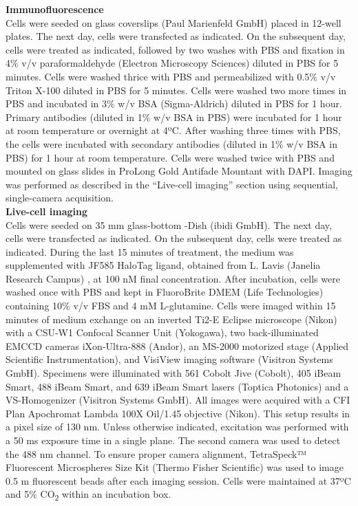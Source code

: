 \textbf{Immunofluorescence} \\
Cells were seeded on glass coverslips (Paul Marienfeld GmbH) placed in 12-well plates.
The next day, cells were transfected as indicated.
On the subsequent day, cells were treated as indicated, followed by two washes with PBS and fixation in 4\% v/v paraformaldehyde (Electron Microscopy Sciences) diluted in PBS for 5 minutes.
Cells were washed thrice with PBS and permeabilized with 0.5\% v/v Triton X-100 diluted in PBS for 5 minutes.
Cells were washed two more times in PBS and incubated in 3\% w/v BSA (Sigma-Aldrich) diluted in PBS for 1 hour.
Primary antibodies (diluted in 1\% w/v BSA in PBS) were incubated for 1 hour at room temperature or overnight at 4ºC.
After washing three times with PBS, the cells were incubated with secondary antibodies (diluted in 1\% w/v BSA in PBS) for 1 hour at room temperature.
Cells were washed twice with PBS and mounted on glass slides in ProLong Gold Antifade Mountant with DAPI.
Imaging was performed as described in the “Live-cell imaging” section using sequential, single-camera acquisition.
\\

\textbf{Live-cell imaging} \\
Cells were seeded on 35 mm glass-bottom \textmu -Dish (ibidi GmbH).
The next day, cells were transfected as indicated.
On the subsequent day, cells were treated as indicated.
During the last 15 minutes of treatment, the medium was supplemented with JF585 HaloTag ligand, obtained from L. Lavis (Janelia Research Campus) \cite{grimm_general_2015,grimm_general_2017}, at 100 nM final concentration.
After incubation, cells were washed once with PBS and kept in FluoroBrite DMEM (Life Technologies) containing 10\% v/v FBS and 4 mM L-glutamine.
Cells were imaged within 15 minutes of medium exchange on an inverted Ti2-E Eclipse microscope (Nikon) with a CSU-W1 Confocal Scanner Unit (Yokogawa), two back-illuminated EMCCD cameras iXon-Ultra-888 (Andor), an MS-2000 motorized stage (Applied Scientific Instrumentation), and VisiView imaging software (Visitron Systems GmbH).
Specimens were illuminated with 561 Cobolt Jive (Cobolt), 405 iBeam Smart, 488 iBeam Smart, and 639 iBeam Smart lasers (Toptica Photonics) and a VS-Homogenizer (Visitron Systems GmbH).
All images were acquired with a CFI Plan Apochromat Lambda 100X Oil/1.45 objective (Nikon).
This setup results in a pixel size of 130 nm.
Unless otherwise indicated, excitation was performed with a 50 ms exposure time in a single plane.
The second camera was used to detect the 488 nm channel.
To ensure proper camera alignment, TetraSpeck™ Fluorescent Microspheres Size Kit (Thermo Fisher Scientific) was used to image 0.5 \textmu m fluorescent beads after each imaging session.
Cells were maintained at 37ºC and 5\% CO\textsubscript{2} within an incubation box.
\\


